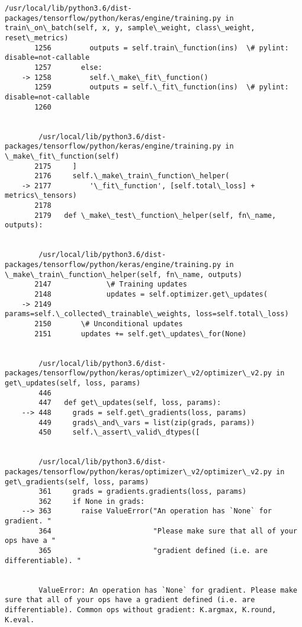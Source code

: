 \documentclass[11pt]{article}
\begin{document}
\begin{Verbatim}[commandchars=\\\{\}]
        /usr/local/lib/python3.6/dist-packages/tensorflow/python/keras/engine/training.py in train\_on\_batch(self, x, y, sample\_weight, class\_weight, reset\_metrics)
       1256         outputs = self.train\_function(ins)  \# pylint: disable=not-callable
       1257       else:
    -> 1258         self.\_make\_fit\_function()
       1259         outputs = self.\_fit\_function(ins)  \# pylint: disable=not-callable
       1260 


        /usr/local/lib/python3.6/dist-packages/tensorflow/python/keras/engine/training.py in \_make\_fit\_function(self)
       2175     ]
       2176     self.\_make\_train\_function\_helper(
    -> 2177         '\_fit\_function', [self.total\_loss] + metrics\_tensors)
       2178 
       2179   def \_make\_test\_function\_helper(self, fn\_name, outputs):


        /usr/local/lib/python3.6/dist-packages/tensorflow/python/keras/engine/training.py in \_make\_train\_function\_helper(self, fn\_name, outputs)
       2147             \# Training updates
       2148             updates = self.optimizer.get\_updates(
    -> 2149                 params=self.\_collected\_trainable\_weights, loss=self.total\_loss)
       2150       \# Unconditional updates
       2151       updates += self.get\_updates\_for(None)


        /usr/local/lib/python3.6/dist-packages/tensorflow/python/keras/optimizer\_v2/optimizer\_v2.py in get\_updates(self, loss, params)
        446 
        447   def get\_updates(self, loss, params):
    --> 448     grads = self.get\_gradients(loss, params)
        449     grads\_and\_vars = list(zip(grads, params))
        450     self.\_assert\_valid\_dtypes([


        /usr/local/lib/python3.6/dist-packages/tensorflow/python/keras/optimizer\_v2/optimizer\_v2.py in get\_gradients(self, loss, params)
        361     grads = gradients.gradients(loss, params)
        362     if None in grads:
    --> 363       raise ValueError("An operation has `None` for gradient. "
        364                        "Please make sure that all of your ops have a "
        365                        "gradient defined (i.e. are differentiable). "


        ValueError: An operation has `None` for gradient. Please make sure that all of your ops have a gradient defined (i.e. are differentiable). Common ops without gradient: K.argmax, K.round, K.eval.

    \end{Verbatim}
\end{document}
